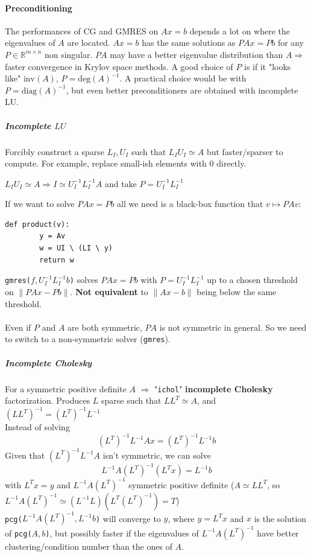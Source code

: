 \documentclass[10pt]{report}
\begin{document}
\paragraph{Preconditioning} The performances of CG and GMRES on $Ax=b$ depends a lot on where the eigenvalues of $A$ are located. $Ax=b$ has the same solutions as $PAx = Pb$ for any $P\in \mathbb{R}^{m\times n}$ non singular. $PA$ may have a better eigenvalue distribution than $A\Rightarrow$ faster convergence in Krylov space methods. A good choice of $P$ is if it "looks like" $\text{inv}(A)$, $P = \text{deg}(A)^{-1}$. A practical choice would be with $P=\text{diag}(A)^{-1}$, but even better preconditioners are obtained with incomplete LU.
\subparagraph{Incomplete $LU$} Forcibly construct a sparse $L_I, U_I$ such that $L_IU_I\simeq A$ but faster/sparser to compute. For example, replace small-ish elements with 0 directly.
\begin{list}{}{}
	\item $L_IU_I\simeq A \Rightarrow I \simeq U_I^{-1}L_I^{-1}A$ and take $P = U_I^{-1}L_I^{-1}$
\end{list}
If we want to solve $PAx=Pb$ all we need is a black-box function that $v\mapsto PAv$:
\begin{lstlisting}[style=myPython]
	def product(v):
		y = Av
		w = UI \ (LI \ y)
		return w
\end{lstlisting}
\texttt{gmres($f, U_I^{-1}L_I^{-1}b$)} solves $PAx=Pb$ with $P = U_I^{-1}L_I^{-1}$ up to a chosen threshold on $\|PAx-Pb\|$. \textbf{Not equivalent} to $\|Ax-b\|$ being below the same threshold.\\\\
Even if $P$ and $A$ are both symmetric, $PA$ is not symmetric in general. So we need to switch to a non-symmetric solver (\texttt{gmres}).
\subparagraph{Incomplete Cholesky} For a symmetric positive definite $A$ $\Rightarrow$ "\texttt{ichol}" \textbf{incomplete Cholesky} factorization. Produces $L$ sparse such that $LL^T\simeq A$, and $(LL^T)^{-1}=(L^T)^{-1}L^{-1}$\\
Instead of solving $$(L^T)^{-1}L^{-1}Ax = (L^T)^{-1}L^{-1}b$$ Given that $(L^T)^{-1}L^{-1}A$ isn't symmetric, we can solve $$L^{-1}A(L^T)^{-1}(L^Tx) = L^{-1}b$$ with $L^Tx=y$ and $L^{-1}A(L^T)^{-1}$ symmetric positive definite ($A\simeq LL^T$, so $L^{-1}A(L^T)^{-1}\simeq(L^{-1}L)(L^T(L^T)^{-1}) = T$)\\
\texttt{pcg($L^{-1}A(L^T)^{-1},L^{-1}b$)} will converge to $y$, where $y=L^Tx$ and $x$ is the solution of \texttt{pcg($A,b$)}, but possibly faster if the eigenvalues of $L^{-1}A(L^T)^{-1}$ have better clustering/condition number than the ones of $A$.
\end{document}
